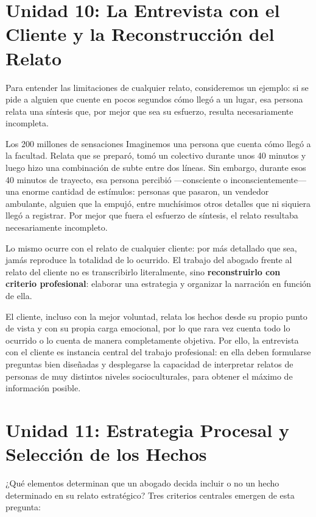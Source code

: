\documentclass[12pt,oneside]{book}
\begin{document}
\section{Unidad 10: La Entrevista con el Cliente y la Reconstrucción del Relato}

Para entender las limitaciones de cualquier relato, consideremos un ejemplo: si se pide a alguien que cuente en pocos segundos cómo llegó a un lugar, esa persona relata una síntesis que, por mejor que sea su esfuerzo, resulta necesariamente incompleta.

\begin{example}{Los 200 millones de sensaciones}
Imaginemos una persona que cuenta cómo llegó a la facultad. Relata que se preparó, tomó un colectivo durante unos 40 minutos y luego hizo una combinación de subte entre dos líneas. Sin embargo, durante esos 40 minutos de trayecto, esa persona percibió ---consciente o inconscientemente--- una enorme cantidad de estímulos: personas que pasaron, un vendedor ambulante, alguien que la empujó, entre muchísimos otros detalles que ni siquiera llegó a registrar. Por mejor que fuera el esfuerzo de síntesis, el relato resultaba necesariamente incompleto.
\end{example}

Lo mismo ocurre con el relato de cualquier cliente: por más detallado que sea, jamás reproduce la totalidad de lo ocurrido. El trabajo del abogado frente al relato del cliente no es transcribirlo literalmente, sino \textbf{reconstruirlo con criterio profesional}: elaborar una estrategia y organizar la narración en función de ella.

El cliente, incluso con la mejor voluntad, relata los hechos desde su propio punto de vista y con su propia carga emocional, por lo que rara vez cuenta todo lo ocurrido o lo cuenta de manera completamente objetiva. Por ello, la entrevista con el cliente es instancia central del trabajo profesional: en ella deben formularse preguntas bien diseñadas y desplegarse la capacidad de interpretar relatos de personas de muy distintos niveles socioculturales, para obtener el máximo de información posible.

\section{Unidad 11: Estrategia Procesal y Selección de los Hechos}

¿Qué elementos determinan que un abogado decida incluir o no un hecho determinado en su relato estratégico? Tres criterios centrales emergen de esta pregunta:
\end{document}
